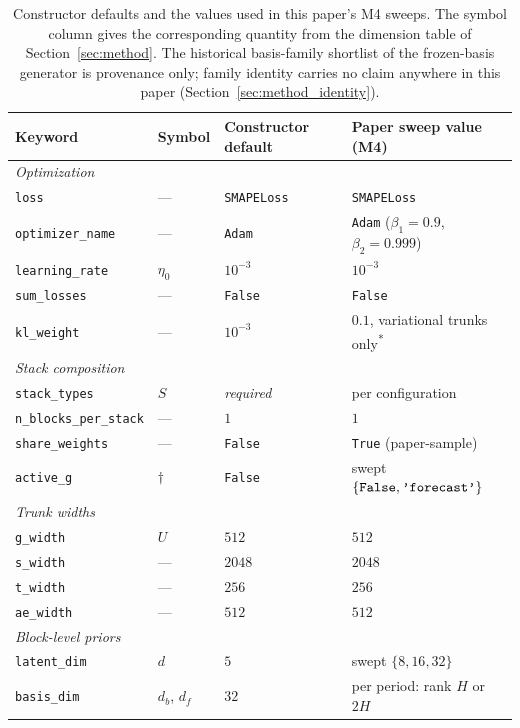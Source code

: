 \begin{table}[h]
\centering
\small
\caption{Constructor defaults and the values used in this paper's M4 sweeps.
The symbol column gives the corresponding quantity from the dimension table
of Section~\ref{sec:method}. The historical basis-family shortlist of the
frozen-basis generator is provenance only; family identity carries no claim
anywhere in this paper (Section~\ref{sec:method_identity}).}
\label{tab:hyperparams_defaults}
\begin{tabular}{@{}llll@{}}
\toprule
Keyword & Symbol & Constructor default & Paper sweep value (M4) \\
\midrule
\multicolumn{4}{l}{\textit{Optimization}} \\
\texttt{loss} & --- & \texttt{SMAPELoss} & \texttt{SMAPELoss} \\
\texttt{optimizer\_name} & --- & \texttt{Adam} & \texttt{Adam} ($\beta_1{=}0.9$, $\beta_2{=}0.999$) \\
\texttt{learning\_rate} & $\eta_0$ & $10^{-3}$ & $10^{-3}$ \\
\texttt{sum\_losses} & --- & \texttt{False} & \texttt{False} \\
\texttt{kl\_weight} & --- & $10^{-3}$ & $0.1$, variational trunks only\phantom{0}\textsuperscript{*} \\
\midrule
\multicolumn{4}{l}{\textit{Stack composition}} \\
\texttt{stack\_types} & $S$ & \emph{required} & per configuration \\
\texttt{n\_blocks\_per\_stack} & --- & $1$ & $1$ \\
\texttt{share\_weights} & --- & \texttt{False} & \texttt{True} (paper-sample) \\
\texttt{active\_g} & $\dagger$ & \texttt{False} & swept $\{\text{\texttt{False}}, \text{\texttt{'forecast'}}\}$ \\
\midrule
\multicolumn{4}{l}{\textit{Trunk widths}} \\
\texttt{g\_width} & $U$ & $512$ & $512$ \\
\texttt{s\_width} & --- & $2048$ & $2048$ \\
\texttt{t\_width} & --- & $256$ & $256$ \\
\texttt{ae\_width} & --- & $512$ & $512$ \\
\midrule
\multicolumn{4}{l}{\textit{Block-level priors}} \\
\texttt{latent\_dim} & $d$ & $5$ & swept $\{8, 16, 32\}$ \\
\texttt{basis\_dim} & $d_b$, $d_f$ & $32$ & per period: rank $H$ or $2H$ \\

\end{tabular}
\end{table}
